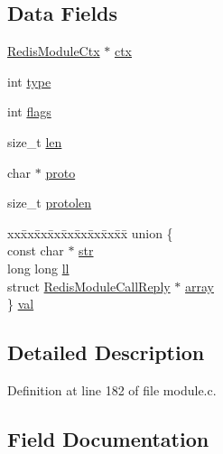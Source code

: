 \subsection*{Data Fields}
\begin{DoxyCompactItemize}
\item 
\hyperlink{struct_redis_module_ctx}{Redis\+Module\+Ctx} $\ast$ \hyperlink{struct_redis_module_call_reply_a221ba73ece36a4c95c593459c3fc1d8d}{ctx}
\item 
int \hyperlink{struct_redis_module_call_reply_ac765329451135abec74c45e1897abf26}{type}
\item 
int \hyperlink{struct_redis_module_call_reply_ac8bf36fe0577cba66bccda3a6f7e80a4}{flags}
\item 
size\+\_\+t \hyperlink{struct_redis_module_call_reply_a7360b55975153b822efc5217b7734e6a}{len}
\item 
char $\ast$ \hyperlink{struct_redis_module_call_reply_a217a90f335b3a7d2fc125fac94c80d95}{proto}
\item 
size\+\_\+t \hyperlink{struct_redis_module_call_reply_a43257d3e2ccef83fbabcc3b06a20b01f}{protolen}
\item 
\begin{tabbing}
xx\=xx\=xx\=xx\=xx\=xx\=xx\=xx\=xx\=\kill
union \{\\
\>const char $\ast$ \hyperlink{struct_redis_module_call_reply_af25d6dc49269fa2003ac7c7fa6f13915}{str}\\
\>long long \hyperlink{struct_redis_module_call_reply_a78dd8c96fe7632134a6dc8665944aa35}{ll}\\
\>struct \hyperlink{struct_redis_module_call_reply}{RedisModuleCallReply} $\ast$ \hyperlink{struct_redis_module_call_reply_ae8b3a272518c53c865e974e0fa56c8b0}{array}\\
\} \hyperlink{struct_redis_module_call_reply_adceb462742f61786b2f766e71de4cabd}{val}\\

\end{tabbing}\end{DoxyCompactItemize}


\subsection{Detailed Description}


Definition at line 182 of file module.\+c.



\subsection{Field Documentation}
\mbox{\label{struct_redis_module_call_reply_ae8b3a272518c53c865e974e0fa56c8b0}} 
